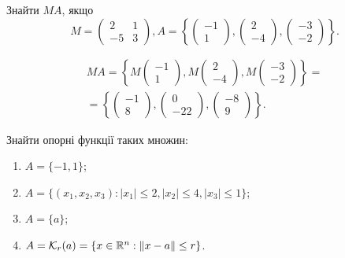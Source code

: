 \begin{problem}
    Знайти $MA$, якщо \[ M = \begin{pmatrix} 2 & 1 \\ -5 & 3 \end{pmatrix}, A = \left\{ \begin{pmatrix} -1 \\ 1 \end{pmatrix}, \begin{pmatrix} 2 \\ -4 \end{pmatrix}, \begin{pmatrix} -3 \\ -2 \end{pmatrix} \right\}. \]
\end{problem}

\begin{solution}
    \begin{multline*} 
        M A = \left\{ M \begin{pmatrix} -1 \\ 1 \end{pmatrix}, M \begin{pmatrix} 2 \\ -4 \end{pmatrix}, M \begin{pmatrix} -3 \\ -2 \end{pmatrix} \right\} = \\
        = \left\{ \begin{pmatrix} -1 \\ 8 \end{pmatrix}, \begin{pmatrix} 0 \\ -22 \end{pmatrix}, \begin{pmatrix} -8 \\ 9 \end{pmatrix} \right\}.
    \end{multline*}        
\end{solution}

\begin{problem}
    Знайти опорні функції таких множин:
    \begin{enumerate}
        \item $A = \{ -1, 1 \}$;
        \item $A = \{ (x_1, x_2, x_3) : |x_1| \le 2, |x_2| \le  4, |x_3| \le 1 \}$;
        \item $A = \{ a \}$;
        \item $A = \mathcal{K}_r(a) = \{ x\in \mathbb{R}^n : \| x - a \| \le r \}$.
    \end{enumerate}
\end{problem}

